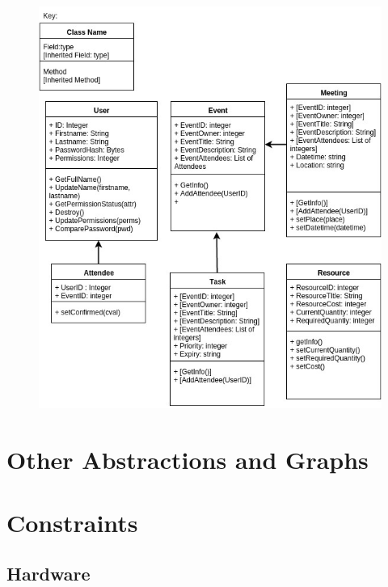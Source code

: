 \begin{figure}[H]
	\includegraphics[width=\textwidth]{./Analysis/diagrams/ods.jpg}
\end{figure}

\section{Other Abstractions and Graphs}

\section{Constraints}

\subsection{Hardware}

